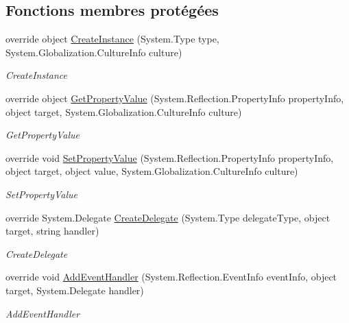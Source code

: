 \subsection*{Fonctions membres protégées}
\begin{DoxyCompactItemize}
\item 
override object \hyperlink{class_xaml_generated_namespace_1_1_generated_internal_type_helper_aefb7a98fceb9c287cef4756942f441d1}{Create\+Instance} (System.\+Type type, System.\+Globalization.\+Culture\+Info culture)
\begin{DoxyCompactList}\small\item\em Create\+Instance \end{DoxyCompactList}\item 
override object \hyperlink{class_xaml_generated_namespace_1_1_generated_internal_type_helper_afdc9fe15b56607d02082908d934480c6}{Get\+Property\+Value} (System.\+Reflection.\+Property\+Info property\+Info, object target, System.\+Globalization.\+Culture\+Info culture)
\begin{DoxyCompactList}\small\item\em Get\+Property\+Value \end{DoxyCompactList}\item 
override void \hyperlink{class_xaml_generated_namespace_1_1_generated_internal_type_helper_ade0f04c0f7b18dd5b170e071d5534d38}{Set\+Property\+Value} (System.\+Reflection.\+Property\+Info property\+Info, object target, object value, System.\+Globalization.\+Culture\+Info culture)
\begin{DoxyCompactList}\small\item\em Set\+Property\+Value \end{DoxyCompactList}\item 
override System.\+Delegate \hyperlink{class_xaml_generated_namespace_1_1_generated_internal_type_helper_a8ec4c37e82d9f4e867e9655f4eac3a78}{Create\+Delegate} (System.\+Type delegate\+Type, object target, string handler)
\begin{DoxyCompactList}\small\item\em Create\+Delegate \end{DoxyCompactList}\item 
override void \hyperlink{class_xaml_generated_namespace_1_1_generated_internal_type_helper_a73471f4a6d1ca4c4fceec9ad8610f0c8}{Add\+Event\+Handler} (System.\+Reflection.\+Event\+Info event\+Info, object target, System.\+Delegate handler)
\begin{DoxyCompactList}\small\item\em Add\+Event\+Handler \end{DoxyCompactList}\item 

\end{DoxyCompactItemize}
